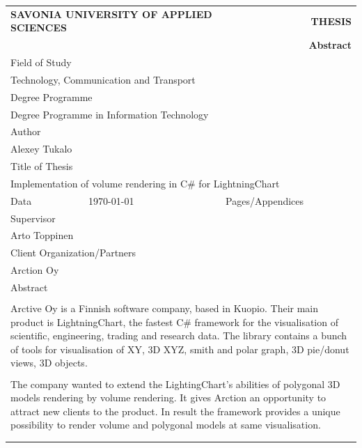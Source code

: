 \documentclass[english, 11pt]{report}
\begin{document}
\begin{table}[!h]
\begin{tabular}{| l | l | l | l |}
\multicolumn{2}{l}{\textbf{SAVONIA UNIVERSITY OF APPLIED SCIENCES}}&
\multicolumn{2}{r}{\textbf{THESIS}}\\
\multicolumn{4}{r}{\textbf{Abstract}}\\
\hline
\multicolumn{4}{|l|}{Field of Study}\\
\multicolumn{4}{|l|}{Technology, Communication and Transport}\\
\hline
\multicolumn{4}{|l|}{Degree Programme}\\
\multicolumn{4}{|l|}{Degree Programme in Information Technology}\\
\hline
\multicolumn{4}{|l|}{Author}\\
\multicolumn{4}{|l|}{Alexey Tukalo}\\
\hline
\multicolumn{4}{|l|}{Title of Thesis}\\
\multicolumn{4}{|l|}{Implementation of volume rendering in C\# for LightningChart}\\
\hline
Data & \today & Pages/Appendices & \pageref{LastPage}\\
\hline
\multicolumn{4}{|l|}{Supervisor}\\
\multicolumn{4}{|l|}{Arto Toppinen}\\
\hline
\multicolumn{4}{|l|}{Client Organization/Partners}\\
\multicolumn{4}{|l|}{Arction Oy}\\
\hline
\multicolumn{4}{|l|}{Abstract}\\
\multicolumn{4}{|l|}{ }\\
\multicolumn{4}{|p{14cm}|}{
Arctive Oy is a Finnish software company, based in Kuopio. Their main product is LightningChart, the fastest C\# framework for the visualisation of scientific, engineering, trading and research data. The library contains a bunch of tools for visualisation of XY, 3D XYZ, smith and polar graph, 3D pie/donut views, 3D objects.
}\\
\multicolumn{4}{|l|}{ }\\
\multicolumn{4}{|p{14cm}|}{
The company wanted to extend the LightingChart's abilities of polygonal 3D models rendering by volume rendering. It gives Arction an opportunity to attract new clients to the product. In result the framework provides a unique possibility to render volume and polygonal models at same visualisation.
}\\
\multicolumn{4}{|l|}{ }\\
\multicolumn{4}{|p{14cm}|}{
}
\end{tabular}
\end{table}
\end{document}
